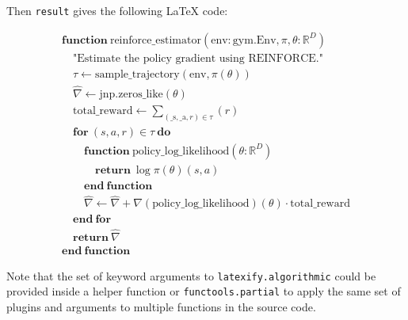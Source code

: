 \documentclass{article}
\begin{document}
Then \verb|result| gives the following \LaTeX{} code:

\[ \begin{array}{l} \mathbf{function} \ \mathrm{reinforce\_estimator}(\mathrm{env}: \mathrm{gym}.\mathrm{Env}, \pi, \theta: \mathbb{R}^{D}) \\ \hspace{1em} \textrm{"Estimate the policy gradient using REINFORCE."} \\ \hspace{1em} \tau \gets \mathrm{sample\_trajectory} \mathopen{}\left( \mathrm{env}, \pi \mathopen{}\left( \theta \mathclose{}\right) \mathclose{}\right) \\ \hspace{1em} \widehat{\nabla} \gets \mathrm{jnp}.\mathrm{zeros\_like} \mathopen{}\left( \theta \mathclose{}\right) \\ \hspace{1em} \mathrm{total\_reward} \gets \sum_{\mathopen{}\left( \mathrm{\_s}, \mathrm{\_a}, r \mathclose{}\right) \in \tau}^{} \mathopen{}\left({r}\mathclose{}\right) \\ \hspace{1em} \mathbf{for} \ \mathopen{}\left( s, a, r \mathclose{}\right) \in \tau \ \mathbf{do} \\ \hspace{2em} \mathbf{function} \ \mathrm{policy\_log\_likelihood}(\theta: \mathbb{R}^{D}) \\ \hspace{3em} \mathbf{return} \ \log \pi \mathopen{}\left( \theta \mathclose{}\right) \mathopen{}\left( s, a \mathclose{}\right) \\ \hspace{2em} \mathbf{end \ function} \\ \hspace{2em} \widehat{\nabla} \gets \widehat{\nabla} + \nabla \mathopen{}\left( \mathrm{policy\_log\_likelihood} \mathclose{}\right) \mathopen{}\left( \theta \mathclose{}\right) \cdot \mathrm{total\_reward} \\ \hspace{1em} \mathbf{end \ for} \\ \hspace{1em} \mathbf{return} \ \widehat{\nabla} \\ \mathbf{end \ function} \end{array} \]

Note that the set of keyword arguments to \verb|latexify.algorithmic| could be provided inside a helper function
or \verb|functools.partial| to apply the same set of plugins and arguments to multiple functions in the source code.
\end{document}
